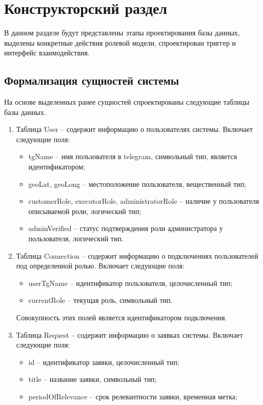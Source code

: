 \chapter{Конструкторский раздел}

В данном разделе будут представлены этапы проектирования базы данных, выделены конкретные действия ролевой модели, спроектирован триггер и интерфейс взаимодействия.

\section{Формализация сущностей системы}

На основе выделенных ранее сущностей спроектированы следующие таблицы базы данных.
\begin{enumerate}
	\item Таблица User -- содержит информацию о пользователях системы. Включает следующие поля:
	\begin{itemize}
		\item tgName -- имя пользователя в telegram, символьный тип, является идентификатором;
		\item geoLat, geoLong -- местоположение пользователя, вещественный тип;
		\item customerRole, executorRole, administratorRole -- наличие у пользователя описываемой роли, логический тип;
		\item adminVerified -- статус подтверждения роли администратора у пользователя, логический тип.
	\end{itemize}
	\item Таблица Connection -- содержит информацию о подключениях пользователей под определенной ролью. Включает следующие поля:
	\begin{itemize}
		\item userTgName -- идентификатор пользователя, целочисленный тип;
		\item currentRole -- текущая роль, символьный тип.
	\end{itemize}
	Совокупность этих полей является идентификатором подключения.
	\item Таблица Request -- содержит информацию о заявках системы. Включает следующие поля:
	\begin{itemize}
		\item id -- идентификатор заявки, целочисленный тип;
		\item title -- название заявки, символьный тип; 
		\item periodOfRelevance -- срок релевантности заявки, временная метка;

\end{itemize}
\end{enumerate}
